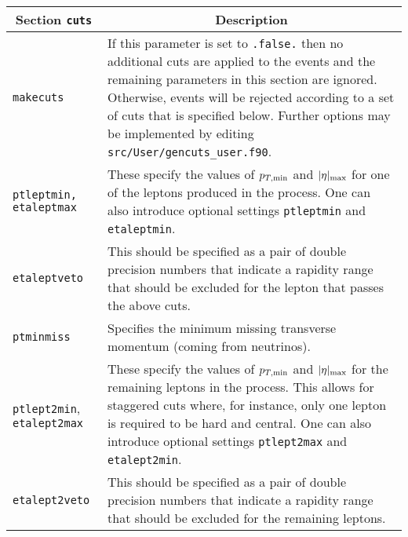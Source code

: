 	\begin{longtable}{p{1.5cm}p{12cm}}
		\toprule
		\multicolumn{1}{c}{{\textbf{Section} \texttt{cuts}}} & \multicolumn{1}{c}{{\textbf{Description}}} \\ 
		\midrule
		\texttt{makecuts} &
		If this parameter is set to {\tt .false.} then
		no additional cuts are applied to the events and the remaining
		parameters in this section are ignored. Otherwise, events will
		be rejected according to a set of cuts that is specified below.
		Further options may be implemented by editing {\tt src/User/gencuts\_user.f90}. \\
		
		{\tt ptleptmin, etaleptmax} & These specify the values
		of $p_{T,{\rm min}}$ and $|\eta|_{\rm max}$ for one of the leptons produced
		in the process. One can also introduce optional settings \texttt{ptleptmin}
		and \texttt{etaleptmin}. \\
		
		{\tt etaleptveto} & This should be specified as a pair of double
		precision numbers that indicate a rapidity range that should be excluded
		for the lepton that passes the above cuts. \\
		
		{\tt ptminmiss} & Specifies the minimum missing transverse
		momentum (coming from neutrinos). \\
		
		{\tt ptlept2min}, \texttt{etalept2max} & These specify
		the values of $p_{T,{\rm min}}$ and $|\eta|_{\rm max}$ for the remaining
		leptons in the process. This allows for staggered cuts where, for
		instance, only one lepton is required to be hard and central.
		One can also introduce optional settings \texttt{ptlept2max} and
		\texttt{etalept2min}. \\
		
		{\tt etalept2veto} & This should be specified as a pair of double
		precision numbers that indicate a rapidity range that should be excluded
		for the remaining leptons. \\
		

\end{longtable}
